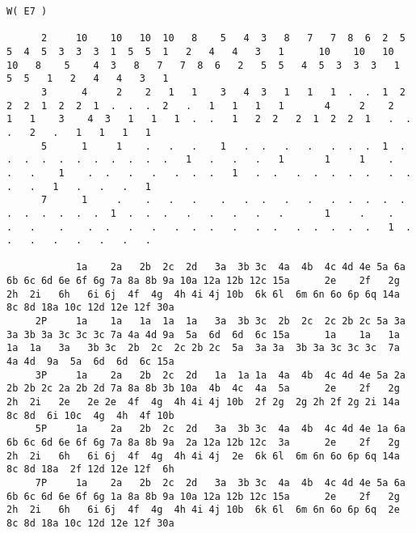 
\usepackage{fullpage}


\tiny
\begin{verbatim}
W( E7 )

      2     10    10   10  10   8    5   4  3   8   7   7  8  6  2  5  5  4  5  3  3  3  1  5  5  1   2   4   4   3   1      10    10   10  10   8    5    4  3   8   7   7  8  6   2   5  5   4  5  3  3  3   1  5  5   1   2   4   4   3   1
      3      4     2    2   1   1    3   4  3   1   1   1  .  .  1  2  2  2  1  2  2  1  .  .  .  2   .   1   1   1   1       4     2    2   1   1    3    4  3   1   1   1  .  .   1   2  2   2  1  2  2  1   .  .  .   2   .   1   1   1   1
      5      1     1    .   .   .    1   .  .   .   .   .  .  .  1  .  .  .  .  .  .  .  .  .  .  .   1   .   .   .   1       1     1    .   .   .    1    .  .   .   .   .  .  .   1   .  .   .  .  .  .  .   .  .  .   .   1   .   .   .   1
      7      1     .    .   .   .    .   .  .   .   .   .  .  .  .  .  .  .  .  .  .  .  1  .  .  .   .   .   .   .   .       1     .    .   .   .    .    .  .   .   .   .  .  .   .   .  .   .  .  .  .  .   1  .  .   .   .   .   .   .   .

            1a    2a   2b  2c  2d   3a  3b 3c  4a  4b  4c 4d 4e 5a 6a 6b 6c 6d 6e 6f 6g 7a 8a 8b 9a 10a 12a 12b 12c 15a      2e    2f   2g  2h  2i   6h   6i 6j  4f  4g  4h 4i 4j 10b  6k 6l  6m 6n 6o 6p 6q 14a 8c 8d 18a 10c 12d 12e 12f 30a
     2P     1a    1a   1a  1a  1a   3a  3b 3c  2b  2c  2c 2b 2c 5a 3a 3a 3b 3a 3c 3c 3c 7a 4a 4d 9a  5a  6d  6d  6c 15a      1a    1a   1a  1a  1a   3a   3b 3c  2b  2c  2c 2b 2c  5a  3a 3a  3b 3a 3c 3c 3c  7a 4a 4d  9a  5a  6d  6d  6c 15a
     3P     1a    2a   2b  2c  2d   1a  1a 1a  4a  4b  4c 4d 4e 5a 2a 2b 2b 2c 2a 2b 2d 7a 8a 8b 3b 10a  4b  4c  4a  5a      2e    2f   2g  2h  2i   2e   2e 2e  4f  4g  4h 4i 4j 10b  2f 2g  2g 2h 2f 2g 2i 14a 8c 8d  6i 10c  4g  4h  4f 10b
     5P     1a    2a   2b  2c  2d   3a  3b 3c  4a  4b  4c 4d 4e 1a 6a 6b 6c 6d 6e 6f 6g 7a 8a 8b 9a  2a 12a 12b 12c  3a      2e    2f   2g  2h  2i   6h   6i 6j  4f  4g  4h 4i 4j  2e  6k 6l  6m 6n 6o 6p 6q 14a 8c 8d 18a  2f 12d 12e 12f  6h
     7P     1a    2a   2b  2c  2d   3a  3b 3c  4a  4b  4c 4d 4e 5a 6a 6b 6c 6d 6e 6f 6g 1a 8a 8b 9a 10a 12a 12b 12c 15a      2e    2f   2g  2h  2i   6h   6i 6j  4f  4g  4h 4i 4j 10b  6k 6l  6m 6n 6o 6p 6q  2e 8c 8d 18a 10c 12d 12e 12f 30a


\end{verbatim}
